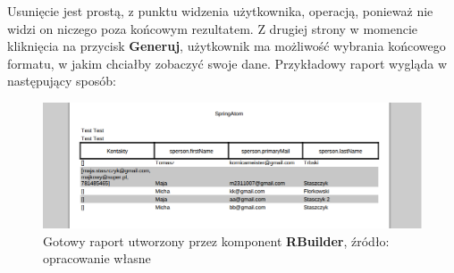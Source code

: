 	Usunięcie jest prostą, z punktu widzenia użytkownika, operacją, ponieważ nie widzi on niczego poza końcowym rezultatem. Z drugiej strony w momencie kliknięcia na przycisk \textbf{Generuj}, użytkownik ma możliwość wybrania końcowego formatu, w jakim chciałby zobaczyć swoje dane. Przykładowy raport wygląda w następujący sposób:
	
	\begin{figure}[H]
		\centering
		\includegraphics[width=1.0\textwidth]{images/rbuilder_report}
		\caption[Gotowy raport utworzony przez komponent \textbf{RBuilder}]{
			Gotowy raport utworzony przez komponent \textbf{RBuilder}, źródło: opracowanie własne
		}
		\label{app:wizard_newReport_report}
	\end{figure}	
	
